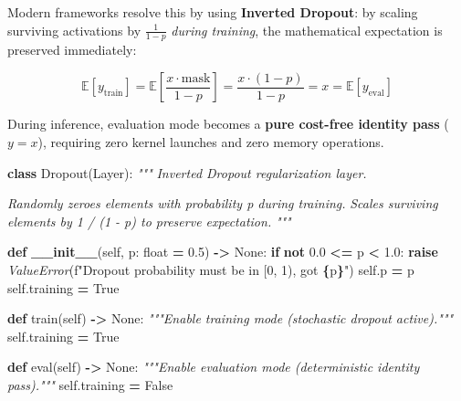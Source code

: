 \documentclass[
  letterpaper,
]{scrbook}
\newenvironment{Shaded}{\begin{snugshade}}{\end{snugshade}}
\newcommand{\BuiltInTok}[1]{#1}
\newcommand{\CommentTok}[1]{\textcolor[rgb]{0.56,0.35,0.01}{\textit{#1}}}
\newcommand{\ControlFlowTok}[1]{\textcolor[rgb]{0.13,0.29,0.53}{\textbf{#1}}}
\newcommand{\FloatTok}[1]{\textcolor[rgb]{0.00,0.00,0.81}{#1}}
\newcommand{\FunctionTok}[1]{\textcolor[rgb]{0.13,0.29,0.53}{\textbf{#1}}}
\newcommand{\KeywordTok}[1]{\textcolor[rgb]{0.13,0.29,0.53}{\textbf{#1}}}
\newcommand{\NormalTok}[1]{#1}
\newcommand{\OperatorTok}[1]{\textcolor[rgb]{0.81,0.36,0.00}{\textbf{#1}}}
\newcommand{\PreprocessorTok}[1]{\textcolor[rgb]{0.56,0.35,0.01}{\textit{#1}}}
\newcommand{\SpecialCharTok}[1]{\textcolor[rgb]{0.81,0.36,0.00}{\textbf{#1}}}
\newcommand{\SpecialStringTok}[1]{\textcolor[rgb]{0.31,0.60,0.02}{#1}}
\newcommand{\VariableTok}[1]{\textcolor[rgb]{0.00,0.00,0.00}{#1}}
\begin{document}
Modern frameworks resolve this by using \textbf{Inverted Dropout}: by
scaling surviving activations by \(\frac{1}{1 - p}\) \emph{during
training}, the mathematical expectation is preserved immediately:

\[\mathbb{E}[y_{\text{train}}] = \mathbb{E}\left[\frac{x \cdot \text{mask}}{1 - p}\right] = \frac{x \cdot (1 - p)}{1 - p} = x = \mathbb{E}[y_{\text{eval}}]\]

During inference, evaluation mode becomes a \textbf{pure cost-free
identity pass} (\(y = x\)), requiring zero kernel launches and zero
memory operations.

\begin{Shaded}
\begin{Highlighting}[]
\KeywordTok{class}\NormalTok{ Dropout(Layer):}
    \CommentTok{"""}
\CommentTok{    Inverted Dropout regularization layer.}

\CommentTok{    Randomly zeroes elements with probability p during training.}
\CommentTok{    Scales surviving elements by 1 / (1 {-} p) to preserve expectation.}
\CommentTok{    """}

    \KeywordTok{def} \FunctionTok{\_\_init\_\_}\NormalTok{(}\VariableTok{self}\NormalTok{, p: }\BuiltInTok{float} \OperatorTok{=} \FloatTok{0.5}\NormalTok{) }\OperatorTok{{-}\textgreater{}} \VariableTok{None}\NormalTok{:}
        \ControlFlowTok{if} \KeywordTok{not} \FloatTok{0.0} \OperatorTok{\textless{}=}\NormalTok{ p }\OperatorTok{\textless{}} \FloatTok{1.0}\NormalTok{:}
            \ControlFlowTok{raise} \PreprocessorTok{ValueError}\NormalTok{(}\SpecialStringTok{f"Dropout probability must be in [0, 1), got }\SpecialCharTok{\{}\NormalTok{p}\SpecialCharTok{\}}\SpecialStringTok{"}\NormalTok{)}
        \VariableTok{self}\NormalTok{.p }\OperatorTok{=}\NormalTok{ p}
        \VariableTok{self}\NormalTok{.training }\OperatorTok{=} \VariableTok{True}

    \KeywordTok{def}\NormalTok{ train(}\VariableTok{self}\NormalTok{) }\OperatorTok{{-}\textgreater{}} \VariableTok{None}\NormalTok{:}
        \CommentTok{"""Enable training mode (stochastic dropout active)."""}
        \VariableTok{self}\NormalTok{.training }\OperatorTok{=} \VariableTok{True}

    \KeywordTok{def} \BuiltInTok{eval}\NormalTok{(}\VariableTok{self}\NormalTok{) }\OperatorTok{{-}\textgreater{}} \VariableTok{None}\NormalTok{:}
        \CommentTok{"""Enable evaluation mode (deterministic identity pass)."""}
        \VariableTok{self}\NormalTok{.training }\OperatorTok{=} \VariableTok{False}


\end{Highlighting}
\end{Shaded}
\end{document}

